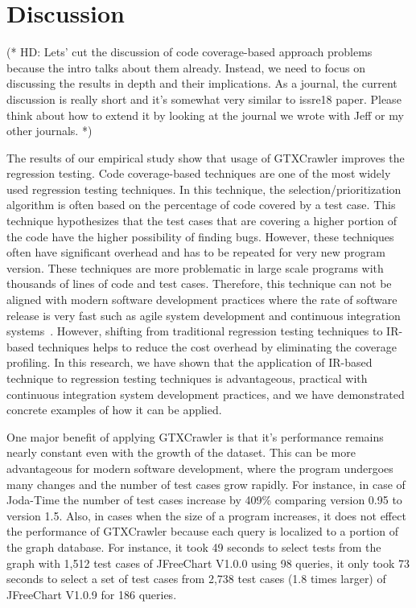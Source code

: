 \section{Discussion}
\label{sec:discussion}

(* HD: Lets' cut the discussion of code coverage-based
approach problems because the intro talks about them already.
Instead, we need to focus on discussing the results in depth and
their implications.
As a journal, the current discussion is really short and
it's somewhat very similar to issre18 paper.
Please think about how to extend it by looking at the journal
we wrote with Jeff or my other journals. *)
 

The results of our empirical study show that 
usage of GTXCrawler improves the regression testing. 
Code coverage-based techniques are one of the most 
widely used regression testing techniques. In this technique, 
the selection/prioritization algorithm is often based 
on the percentage of code covered by a test case. 
This technique hypothesizes that the test cases that 
are covering a higher portion of the code have the 
higher possibility of finding bugs. However, these 
techniques often have significant overhead and has to 
be repeated for very new program version. These techniques 
are more problematic in large scale programs 
with thousands of lines of code and test cases. 
Therefore, this technique can not be aligned with modern 
software development practices where the rate of software 
release is very fast such as 
agile system development and continuous integration 
systems~\cite{}. However, shifting from traditional 
regression testing techniques to IR-based techniques 
helps to reduce the cost overhead by eliminating the 
coverage profiling. In this research, we have shown 
that the application of IR-based technique to 
regression testing techniques is advantageous, 
practical with continuous integration system 
development practices, and we have demonstrated 
concrete examples of how it can be applied.



One major benefit of applying GTXCrawler is that it's 
performance remains nearly constant even with the 
growth of the dataset. This can be more advantageous 
for modern software development, where the program 
undergoes many changes and the number of test cases 
grow rapidly. For instance, in case of Joda-Time 
the number of test cases increase by 409\% comparing 
version 0.95 to version 1.5. Also, in cases when the 
size of a program increases, it does not effect the 
performance of GTXCrawler because each query is 
localized to a portion of the graph database. 
For instance, it took 49 seconds to select tests 
from the graph with 1,512 test cases of 
JFreeChart V1.0.0 using 98 queries, it only took 
73 seconds to select a set of test cases from 2,738 
test cases (1.8 times larger) of JFreeChart V1.0.9 for 186 queries.


